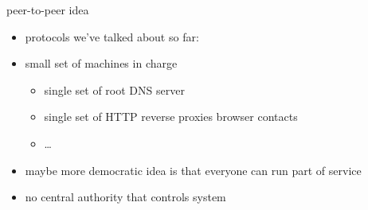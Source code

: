 \begin{frame}{peer-to-peer idea}
    \begin{itemize}
    \item protocols we've talked about so far:
    \vspace{.5cm}
    \item small set of machines in charge
        \begin{itemize}
        \item single set of root DNS server
        \item single set of HTTP reverse proxies browser contacts
        \item \ldots
        \end{itemize}
    \item maybe more democratic idea is that everyone can run part of service
    \item no central authority that controls system
    \end{itemize}
\end{frame}
